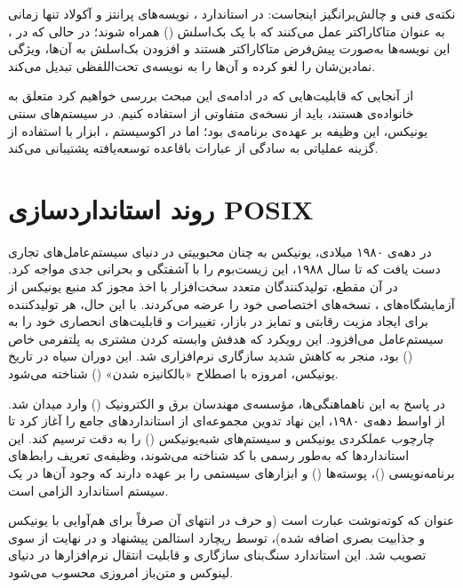 نکته‌ی فنی و چالش‌برانگیز اینجاست: در استاندارد ، نویسه‌های پرانتز \cmd{( )} و آکولاد \cmd{\{ \}} تنها زمانی به عنوان متاکاراکتر عمل می‌کنند که با یک بک‌اسلش (\cmd{\textbackslash}) همراه شوند؛ در حالی که در ، این نویسه‌ها به‌صورت پیش‌فرض متاکاراکتر هستند و افزودن بک‌اسلش به آن‌ها، ویژگی نمادین‌شان را لغو کرده و آن‌ها را به نویسه‌ی تحت‌اللفظی تبدیل می‌کند.

از آنجایی که قابلیت‌هایی که در ادامه‌ی این مبحث بررسی خواهیم کرد متعلق به خانواده‌ی  هستند، باید از نسخه‌ی متفاوتی از  استفاده کنیم. در سیستم‌های سنتی یونیکس، این وظیفه بر عهده‌ی برنامه‌ی  بود؛ اما در اکوسیستم ، ابزار  با استفاده از گزینه عملیاتی  به سادگی از عبارات باقاعده توسعه‌یافته پشتیبانی می‌کند.

\section{روند استانداردسازی POSIX}

در دهه‌ی ۱۹۸۰ میلادی، یونیکس به چنان محبوبیتی در دنیای سیستم‌عامل‌های تجاری دست یافت که تا سال ۱۹۸۸، این زیست‌بوم را با آشفتگی و بحرانی جدی مواجه کرد. در آن مقطع، تولیدکنندگان متعدد سخت‌افزار با اخذ مجوز کد منبع یونیکس از آزمایشگاه‌های ، نسخه‌های اختصاصی خود را عرضه می‌کردند. با این حال، هر تولیدکننده برای ایجاد مزیت رقابتی و تمایز در بازار، تغییرات و قابلیت‌های انحصاری خود را به سیستم‌عامل می‌افزود. این رویکرد که هدفش وابسته کردن مشتری به پلتفرمی خاص () بود، منجر به کاهش شدید سازگاری نرم‌افزاری شد. این دوران سیاه در تاریخ یونیکس، امروزه با اصطلاح «بالکانیزه شدن» () شناخته می‌شود.

در پاسخ به این ناهماهنگی‌ها، مؤسسه‌ی مهندسان برق و الکترونیک () وارد میدان شد. از اواسط دهه‌ی ۱۹۸۰، این نهاد تدوین مجموعه‌ای از استانداردهای جامع را آغاز کرد تا چارچوب عملکردی یونیکس و سیستم‌های شبه‌یونیکس () را به دقت ترسیم کند. این استانداردها که به‌طور رسمی با کد  شناخته می‌شوند، وظیفه‌ی تعریف رابط‌های برنامه‌نویسی ()، پوسته‌ها () و ابزارهای سیستمی را بر عهده دارند که وجود آن‌ها در یک سیستم استاندارد الزامی است.

عنوان  که کوته‌نوشت عبارت  است (و حرف  در انتهای آن صرفاً برای هم‌آوایی با یونیکس و جذابیت بصری اضافه شده)، توسط ریچارد استالمن پیشنهاد و در نهایت از سوی  تصویب شد. این استاندارد سنگ‌بنای سازگاری و قابلیت انتقال نرم‌افزارها در دنیای لینوکس و متن‌باز امروزی محسوب می‌شود.

